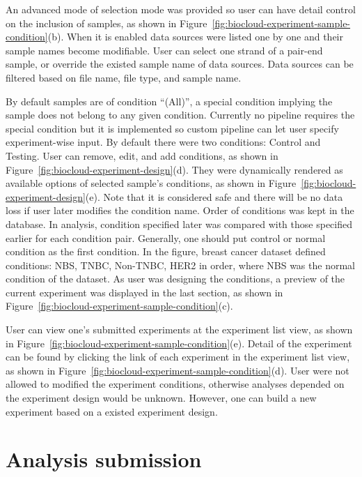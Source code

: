 An advanced mode of selection mode was provided so user can have detail control
on the inclusion of samples, as shown in
Figure~\ref{fig:biocloud-experiment-sample-condition}(b). When it is enabled
data sources were listed one by one and their sample names become modifiable.
User can select one strand of a pair-end sample, or override the existed sample
name of data sources. Data sources can be filtered based on file name, file
type, and sample name.

By default samples are of condition ``(All)'', a special condition implying the
sample does not belong to any given condition. Currently no pipeline requires
the special condition but it is implemented so custom pipeline can let user
specify experiment-wise input. By default there were two conditions: Control
and Testing. User can remove, edit, and add conditions, as shown in
Figure~\ref{fig:biocloud-experiment-design}(d). They were dynamically rendered
as available options of selected sample's conditions, as shown in
Figure~\ref{fig:biocloud-experiment-design}(e). Note that it is considered safe
and there will be no data loss if user later modifies the condition name.
Order of conditions was kept in the database. In analysis, condition specified
later was compared with those specified earlier for each condition pair.
Generally, one should put control or normal condition as the first condition.
In the figure, breast cancer dataset defined conditions: NBS, TNBC, Non-TNBC,
HER2 in order, where NBS was the normal condition of the dataset. As user was
designing the conditions, a preview of the current experiment was displayed in
the last section, as shown in
Figure~\ref{fig:biocloud-experiment-sample-condition}(c).

User can view one's submitted experiments at the experiment list view, as shown
in Figure~\ref{fig:biocloud-experiment-sample-condition}(e). Detail of the
experiment can be found by clicking the link of each experiment in the
experiment list view, as shown in
Figure~\ref{fig:biocloud-experiment-sample-condition}(d). User were not allowed
to modified the experiment conditions, otherwise analyses depended on the
experiment design would be unknown. However, one can build a new experiment
based on a existed experiment design.



\section{Analysis submission}

